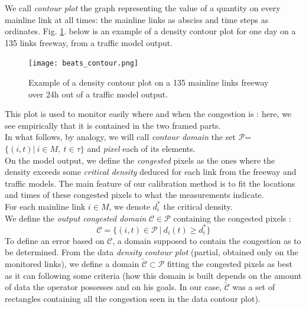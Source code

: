 We call \emph{contour plot} the graph representing the value of a quantity on every mainline link at all times: the mainline links as absciss and time steps as ordinates.
Fig. \ref{fig:beats_contour}. below is an example of a density contour plot for one day on a 135 links freeway, from a traffic model output.\\
\begin{figure}[h]
	\centering
	\label{fig:beats_contour}
	\texttt{[image: beats\_contour.png]}
	\caption{Example of a density contour plot on a 135 mainline links freeway over 24h out of a traffic model output.}
\end{figure}
This plot is used to monitor easily where and when the congestion is : here, we see empirically that it is contained in the two framed parts.\\
In what follows, by analogy, we will call \emph{contour domain} the set $\mathscr{P}$=$\big\{(i,t)|\ i\in M,\ t\in\tau\big\}$ and \emph{pixel} each of its elements.\\
On the model output, we define the \emph{congested} pixels as the ones where the density exceeds some \emph{critical density} deduced for each link from the freeway and traffic models. The main feature of our calibration method is to fit the locations and times of these congested pixels to what the measurements indicate.\\
For each mainline link $i\in{M}$, we denote $d_{i}^{*}$ the critical density.
\\
We define the \emph{output congested domain} $\mathscr{C}\in\mathscr{P}$ containing the congested pixels :
\begin{equation*}
	\mathscr{C}=\big\{ (i,t)\in{\mathscr{P}}\ |\ {d_{i}(t) \geq d_{i}^{*}}\big\}
\end{equation*}
To define an error based on $\mathscr{C}$, a domain supposed to contain the congestion as to be determined.
From the data \emph{density contour plot} (partial, obtained only on the monitored links), we define a domain $\widetilde{\mathscr{C}}\subset\mathscr{P}$ fitting the congested pixels as best as it can following some criteria (how this domain is built depends on the amount of data the operator possesses and on his goals. In our case, $\widetilde{\mathscr{C}}$ was a set of rectangles containing all the congestion seen in the data contour plot).\\
